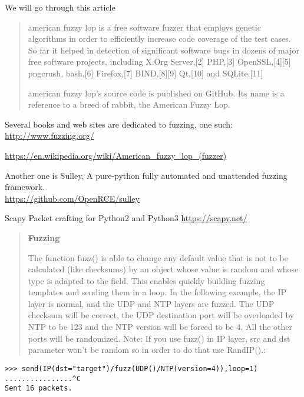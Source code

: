 \documentclass[Screen16to9,17pt]{foils}
\begin{document}
We will go through this article





\begin{quote}
american fuzzy lop is a free software fuzzer that employs genetic algorithms in order to efficiently increase code coverage of the test cases. So far it helped in detection of significant software bugs in dozens of major free software projects, including X.Org Server,[2] PHP,[3] OpenSSL,[4][5] pngcrush, bash,[6] Firefox,[7] BIND,[8][9] Qt,[10] and SQLite.[11]

american fuzzy lop's source code is published on GitHub. Its name is a reference to a breed of rabbit, the American Fuzzy Lop.
\end{quote}

\begin{list2}
\item Several books and web sites are dedicated to fuzzing, one such:\\ \url{http://www.fuzzing.org/}
\item \url{https://en.wikipedia.org/wiki/American_fuzzy_lop_(fuzzer)}
\item Another one is Sulley, A pure-python fully automated and unattended fuzzing framework.\\
\url{https://github.com/OpenRCE/sulley}
\item Scapy Packet crafting for Python2 and Python3
\url{https://scapy.net/}
\end{list2}



\begin{quote}{\bf
Fuzzing}

The function fuzz() is able to change any default value that is not to be calculated (like checksums) by an object whose value is random and whose type is adapted to the field. This enables quickly building fuzzing templates and sending them in a loop. In the following example, the IP layer is normal, and the UDP and NTP layers are fuzzed. The UDP checksum will be correct, the UDP destination port will be overloaded by NTP to be 123 and the NTP version will be forced to be 4. All the other ports will be randomized. Note: If you use fuzz() in IP layer, src and dst parameter won’t be random so in order to do that use RandIP().:
\end{quote}

\begin{verbatim}
>>> send(IP(dst="target")/fuzz(UDP()/NTP(version=4)),loop=1)
................^C
Sent 16 packets.
\end{verbatim}
\end{document}
